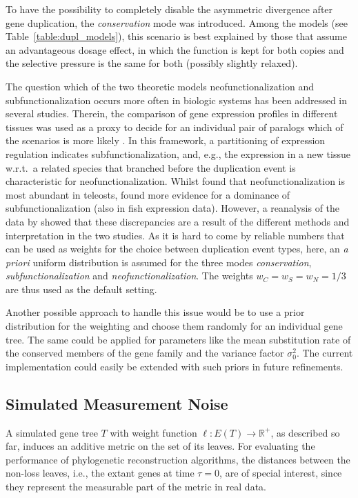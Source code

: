 \documentclass[hidelinks,11pt]{scrreprt}
\begin{document}
To have the possibility to completely disable the asymmetric divergence after gene duplication, the \textit{conservation} mode was introduced. Among the models (see Table~\ref{table:dupl_models}), this scenario is best explained by those that assume an advantageous dosage effect, in which the function is kept for both copies and the selective pressure is the same for both (possibly slightly relaxed).

The question which of the two theoretic models neofunctionalization and subfunctionalization occurs more often in biologic systems has been addressed in several studies. Therein, the comparison of gene expression profiles in different tissues was used as a proxy to decide for an individual pair of paralogs which of the scenarios is more likely \citep{lien2016,braasch2016}. In this framework, a partitioning of expression regulation indicates subfunctionalization, and, e.g., the expression in a new tissue w.r.t.\ a related species that branched before the duplication event is characteristic for neofunctionalization. Whilst \citet{lien2016} found that neofunctionalization is most abundant in teleosts, \citet{braasch2016} found more evidence for a dominance of subfunctionalization (also in fish expression data). However, a reanalysis of the data by \citet{sandve2018} showed that these discrepancies are a result of the different methods and interpretation in the two studies. As it is hard to come by reliable numbers that can be used as weights for the choice between duplication event types, here, an \textit{a priori} uniform distribution is assumed for the three modes \textit{conservation}, \textit{subfunctionalization} and \textit{neofunctionalization}. The weights $w_C=w_S=w_N=1/3$ are thus used as the default setting.

Another possible approach to handle this issue would be to use a prior distribution for the weighting and choose them randomly for an individual gene tree. The same could be applied for parameters like the mean substitution rate of the conserved members of the gene family and the variance factor $\sigma^2_0$. The current implementation could easily be extended with such priors in future refinements.

\subsection{Simulated Measurement Noise}
\label{sec:measurement_noise}

A simulated gene tree $T$ with weight function $\ell: E(T)\to \mathbb{R}^+$, as described so far, induces an additive metric on the set of its leaves. For evaluating the performance of phylogenetic reconstruction algorithms, the distances between the non-loss leaves, i.e., the extant genes at time $\tau=0$, are of special interest, since they represent the measurable part of the metric in real data.
\end{document}

